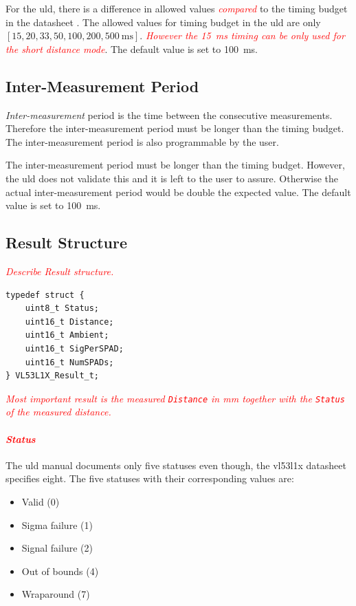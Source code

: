 \documentclass[
  digital,     %
  oneside,     %
  nosansbold,  %
  nocolorbold, %
  lof,         %
  lot,         %
]{fithesis4}
\newcommand{\TODO}[1]{\textcolor{red}{\textit{#1}}}
\begin{document}
{{{For the \acrshort{uld}, there is a difference in allowed values \TODO{compared} to the timing budget in the datasheet \cite{vl53l1x}. The allowed values for timing budget in the \acrshort{uld} are only $[15, 20,
33, 50, 100, 200, \qty{500}{\milli\second}]$. \TODO{However the \qty{15}{\milli\second} timing can be only used for the short distance mode}. The default value is set to \qty{100}{\milli\second}.

\subsection{ Inter-Measurement Period }
\emph{Inter-measurement} period is the time between the consecutive measurements. Therefore the inter-measurement period must be longer than the timing budget. The inter-measurement period is also programmable by the user.

The inter-measurement period must be longer than the timing budget. However, the \acrshort{uld} does not validate this and it is left to the user to assure. Otherwise the actual inter-measurement period would be double the expected value. The default value is set to \qty{100}{\milli\second}.

\subsection{ Result Structure } \label{sec:lidar-result}
\TODO{Describe Result structure.}

\begin{lstlisting}
typedef struct {
    uint8_t Status;
    uint16_t Distance;
    uint16_t Ambient;
    uint16_t SigPerSPAD;
    uint16_t NumSPADs;
} VL53L1X_Result_t;
\end{lstlisting}

\TODO{
Most important result is the measured \lstinline|Distance| in \unit{\milli\metre} together with the \lstinline|Status| of the measured distance.
}

\paragraph{\TODO{Status}}

The \acrshort{uld} manual \cite{um2510} documents only five statuses even though, the \gls{vl53l1x} datasheet \cite{vl53l1x} specifies eight. The five statuses with their corresponding values are:
\begin{itemize}
    \item Valid (0)
    \item Sigma failure (1)
    \item Signal failure (2)
    \item Out of bounds (4)
    \item Wraparound (7)
\end{itemize}

}}}
\end{document}
